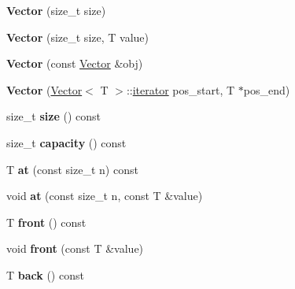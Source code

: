 \begin{DoxyCompactItemize}
\item 
\mbox{\label{class_vector_a0a182fd3a89769a7ba22d560ae6e8439}} 
{\bfseries Vector} (size\+\_\+t size)
\item 
\mbox{\label{class_vector_a67cc36c29e716e5f803ad92b3d2d3fae}} 
{\bfseries Vector} (size\+\_\+t size, T value)
\item 
\mbox{\label{class_vector_a02d21914cd0e4dc56baec126141b5516}} 
{\bfseries Vector} (const \mbox{\hyperlink{class_vector}{Vector}} \&obj)
\item 
\mbox{\label{class_vector_af070b4bfd7134f280870932fefcb83e9}} 
{\bfseries Vector} (\mbox{\hyperlink{class_vector}{Vector}}$<$ T $>$\+::\mbox{\hyperlink{class_vector_1_1iterator}{iterator}} pos\+\_\+start, T $\ast$pos\+\_\+end)
\item 
\mbox{\label{class_vector_a9b439586cd10cb45d002ca9d6e3db43c}} 
size\+\_\+t {\bfseries size} () const
\item 
\mbox{\label{class_vector_a85c39fed5822d2a03a3250336039c933}} 
size\+\_\+t {\bfseries capacity} () const
\item 
\mbox{\label{class_vector_a5ed0634daae788c7256be6f4186fbccc}} 
T {\bfseries at} (const size\+\_\+t n) const
\item 
\mbox{\label{class_vector_ad642587097f58d4e65cf8011d4022eae}} 
void {\bfseries at} (const size\+\_\+t n, const T \&value)
\item 
\mbox{\label{class_vector_a237ab21eb5459aa729d157c27606725d}} 
T {\bfseries front} () const
\item 
\mbox{\label{class_vector_a3c0f9f2af8fa9cfc3cf3b89a81db44b3}} 
void {\bfseries front} (const T \&value)
\item 
\mbox{\label{class_vector_a50880f90b629b19db48d8fa13adbe7ec}} 
T {\bfseries back} () const
\item 
\mbox{\label{class_vector_a6ece52658e8eaf09dd8ee869faac29da}} 

\end{DoxyCompactItemize}
